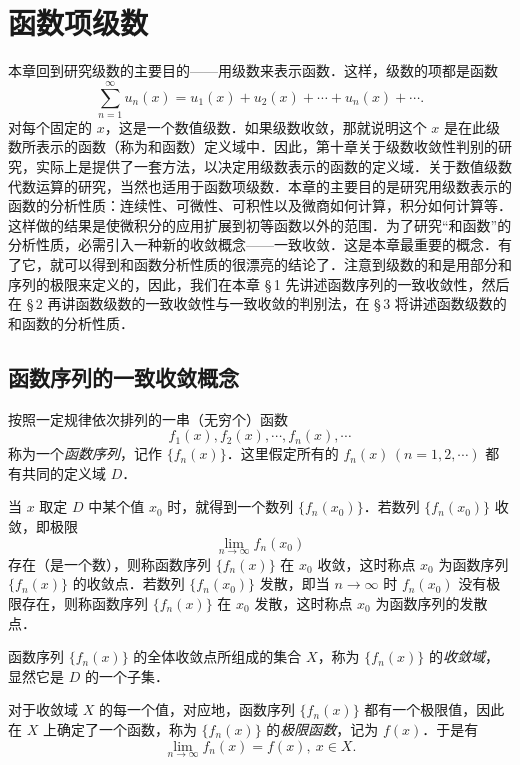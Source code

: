 \newcommand{\varlimlim}{\mathop{\mathrm{lim}}\limits}
\chapter{函数项级数}

本章回到研究级数的主要目的——用级数来表示函数．这样，级数的项都是函数
\[
\sum_{n=1}^{\infty}u_{n}(x)=u_{1}(x)+u_{2}(x)+\cdots+u_{n}(x)+\cdots.
\]
对每个固定的 $x$，这是一个数值级数．如果级数收敛，那就说明这个 $x$ 是在此级数所表示的函数（称为和函数）定义域中．因此，第十章关于级数收敛性判别的研究，实际上是提供了一套方法，以决定用级数表示的函数的定义域．关于数值级数代数运算的研究，当然也适用于函数项级数．本章的主要目的是研究用级数表示的函数的分析性质：连续性、可微性、可积性以及微商如何计算，积分如何计算等．这样做的结果是使微积分的应用扩展到初等函数以外的范围．为了研究``和函数''的分析性质，必需引入一种新的收敛概念——一致收敛．这是本章最重要的概念．有了它，就可以得到和函数分析性质的很漂亮的结论了．注意到级数的和是用部分和序列的极限来定义的，因此，我们在本章 \S\,1 先讲述函数序列的一致收敛性，然后在 \S\,2 再讲函数级数的一致收敛性与一致收敛的判别法，在 \S\,3 将讲述函数级数的和函数的分析性质．

\section{函数序列的一致收敛概念}

按照一定规律依次排列的一串（无穷个）函数
\[
f_{1}(x),f_{2}(x),\cdots,f_{n}(x),\cdots
\]
称为一个\emph{函数序列}，记作 $\{f_{n}(x)\}$．这里假定所有的 $f_{n}(x)\,(n=1,2,\cdots)$ 都有共同的定义域 $D$．

当 $x$ 取定 $D$ 中某个值 $x_{0}$ 时，就得到一个数列 $\{f_{n}(x_{0})\}$．若数列 $\{f_{n}(x_{0})\}$ 收敛，即极限
\[
\lim_{n\to\infty}f_{n}(x_{0})
\]
存在（是一个数），则称函数序列 $\{f_{n}(x)\}$ 在 $x_{0}$ 收敛，这时称点 $x_{0}$ 为函数序列 $\{f_{n}(x)\}$ 的收敛点．若数列 $\{f_{n}(x_{0})\}$ 发散，即当 $n\to\infty$ 时 $f_{n}(x_{0})$ 没有极限存在，则称函数序列 $\{f_{n}(x)\}$ 在 $x_{0}$ 发散，这时称点 $x_{0}$ 为函数序列的发散点．

函数序列 $\{f_{n}(x)\}$ 的全体收敛点所组成的集合 $X$，称为 $\{f_{n}(x)\}$ 的\emph{收敛域}，显然它是 $D$ 的一个子集．

对于收敛域 $X$ 的每一个值，对应地，函数序列 $\{f_{n}(x)\}$ 都有一个极限值，因此在 $X$ 上确定了一个函数，称为 $\{f_{n}(x)\}$ 的\emph{极限函数}，记为 $f(x)$．于是有
\[
\lim_{n\to\infty}f_{n}(x)=f(x),\ x\in X.
\]

